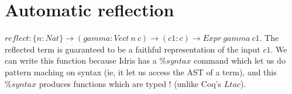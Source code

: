 \section{Automatic reflection}

$reflect : \{n:Nat\} \rightarrow (gamma : Vect\ n\ c) \rightarrow (c1:c) \rightarrow Expr\ gamma\ c1$.
The reflected term is guaranteed to be a faithful representation of the input $c1$. We can write this function because Idris has a $\%syntax$ command which let us do pattern maching on syntax (ie, it let us access the AST of a term), and this $\%syntax$ produces functions which are typed ! (unlike Coq's $Ltac$). 
